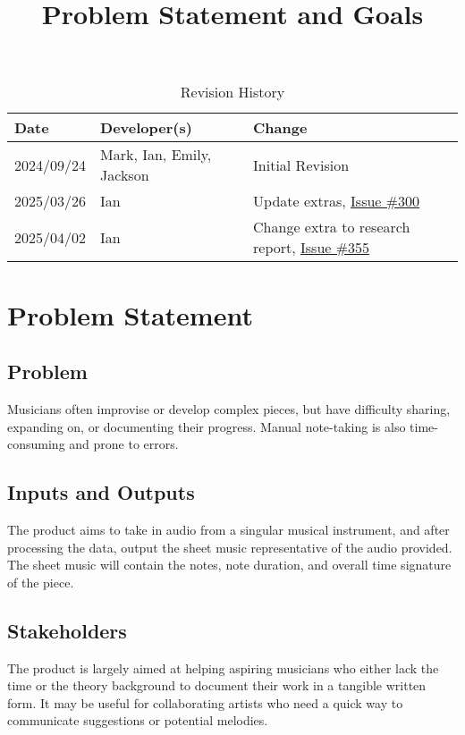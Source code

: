 \documentclass{article}
\title{Problem Statement and Goals\\\progname}
\author{\authname}
\date{}
\begin{document}
\maketitle

\begin{table}[hp]
\caption{Revision History} \label{TblRevisionHistory}
\begin{tabularx}{\textwidth}{llX}
\toprule
\textbf{Date} & \textbf{Developer(s)} & \textbf{Change}\\
\midrule
2024/09/24 & Mark, Ian, Emily, Jackson & Initial Revision\\
2025/03/26 & Ian & Update extras, \href{https://github.com/emilyperica/ScoreGen/issues/300}{Issue \#300}\\
2025/04/02 & Ian & Change extra to research report, \href{https://github.com/emilyperica/ScoreGen/issues/355}{Issue \#355}\\
\bottomrule
\end{tabularx}
\end{table}

\section{Problem Statement}

\subsection{Problem}
Musicians often improvise or develop complex pieces, but have difficulty sharing, expanding on, or documenting their progress. Manual note-taking is also time-consuming and prone to errors.

\subsection{Inputs and Outputs}

The product aims to take in audio from a singular musical instrument, and after processing the data, output the sheet music representative of the audio provided. The sheet music will contain the notes, note duration, and overall time signature of the piece.


\subsection{Stakeholders}

The product is largely aimed at helping aspiring musicians who either lack the time or the theory background to document their work in a tangible written form. It may be useful for collaborating artists who need a quick way to communicate suggestions or potential melodies.
\end{document}
